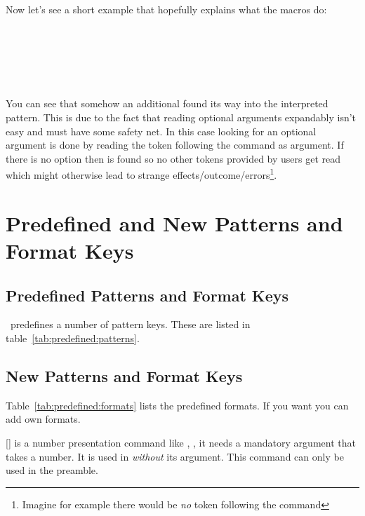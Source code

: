 \documentclass[load-preamble+]{cnltx-doc}
\begin{document}
Now let's see a short example that hopefully explains what the macros do:
\begin{example}
  \setcounter{testa}{11}
   \\
  \ttfamily\makeatletter
  \meaning\@cntfmts@parsed@pattern
  
  \bigskip
  \SaveCounterPattern\tmpa{}
  \meaning\tmpa \\
  \meaning\tmpb
  
  \bigskip
  \eSaveCounterPattern\tmpa{}
  \meaning\tmpa \\
  \meaning\tmpb
\end{example}
You can see that somehow an additional  found its way into the
interpreted pattern. This is due to the fact that reading optional arguments
expandably isn't easy and must have some safety net.  In this case looking for
an optional argument is done by reading the token following the command as
argument.  If there is no option then  is found so no other tokens
provided by users get read which might otherwise lead to strange
effects/outcome/errors\footnote{Imagine for example there would be \emph{no}
  token following the command}.

\section{Predefined and New Patterns and Format Keys}
\subsection{Predefined Patterns and Format Keys}
\cntformats\ predefines a number of pattern keys. These are listed in
table~\ref{tab:predefined:patterns}.

\subsection{New Patterns and Format Keys}
Table~\ref{tab:predefined:formats} lists the predefined formats.  If you want
you can add own formats.
\begin{commands}
  []
     is a number presentation command like , \ie,
    it needs a mandatory argument that takes a number.  It is used in
     \emph{without} its argument.  This command can only be used
    in the preamble.
\end{commands}
\end{document}
